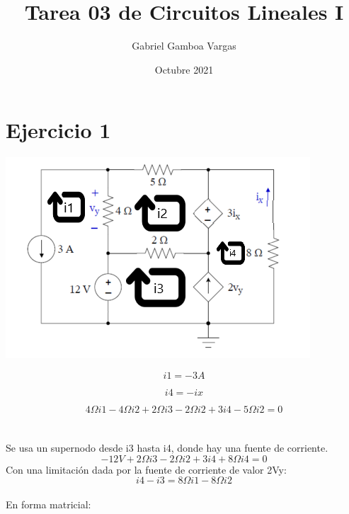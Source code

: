\documentclass{article}
\title{Tarea 03 de Circuitos Lineales I}
\author{Gabriel Gamboa Vargas}
\date{Octubre 2021}
\begin{document}
\maketitle
\section{Ejercicio 1}
\includegraphics[]{images/ejercicio1.PNG}

\begin{equation} 
    i1 = -3A
\end{equation}
 
\begin{equation} 
    i4 = -ix
\end{equation}

\begin{equation} 
   {4\Omega} i1 - {4\Omega} i2 + {2\Omega}i3 - {2\Omega}i2 +3i4 - {5\Omega}i2 = 0
\end{equation}
\\ \\
 Se usa un supernodo desde i3 hasta i4, donde hay una fuente de corriente.\\

\begin{equation}
   -12V + {2\Omega}i3 -{2\Omega}i2 + 3i4 + {8\Omega}i4 = 0
\end{equation}
Con una limitación dada por la fuente de corriente de valor 2Vy: \\

\begin{equation}
   i4 - i3 = {8\Omega}i1 -{8\Omega}i2
\end{equation}
\\ En forma matricial: \\ \\ 
\end{document}
